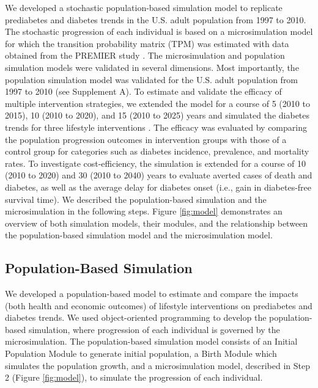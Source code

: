 \documentclass[fleqn,10pt]{wlscirep}
\begin{document}
We developed a stochastic population-based simulation model to replicate prediabetes and diabetes trends in the U.S. adult population from 1997 to 2010. The stochastic progression of each individual is based on a microsimulation model for which the transition probability matrix (TPM) was estimated with data obtained from the PREMIER study \cite{svetkey:premier:2003}. The microsimulation and population simulation models were validated in several dimensions. Most importantly, the population simulation model was validated for the U.S. adult population from 1997 to 2010 (see Supplement A). To estimate and validate the efficacy of multiple intervention strategies, we extended the model for a course of 5 (2010 to 2015), 10 (2010 to 2020), and 15 (2010 to 2025) years and simulated the diabetes trends for three lifestyle interventions \cite{diabetes:prevention:program:research:group:reduction:2002,ackermann:randomized:2015,katula:one-year:2011}. The efficacy was evaluated by comparing the population progression outcomes in intervention groups with those of a control group for categories such as diabetes incidence, prevalence, and mortality rates. To investigate cost-efficiency, the simulation is extended for a course of 10 (2010 to 2020) and 30 (2010 to 2040) years to evaluate averted cases of death and diabetes, as well as the average delay for diabetes onset (i.e., gain in diabetes-free survival time). We described the population-based simulation and the microsimulation in the following steps. Figure \ref{fig:model} demonstrates an overview of both simulation models, their modules, and the relationship between the population-based simulation model and the microsimulation model.

\subsection*{Population-Based Simulation}

We developed a population-based model to estimate and compare the impacts (both health and economic outcomes) of lifestyle interventions on prediabetes and diabetes trends. We used object-oriented programming to develop the population-based simulation, where progression of each individual is governed by the microsimulation. The population-based simulation model consists of an Initial Population Module to generate initial population, a Birth Module which simulates the population growth, and a microsimulation model, described in Step 2 (Figure \ref{fig:model}), to simulate the progression of each individual.
\end{document}
